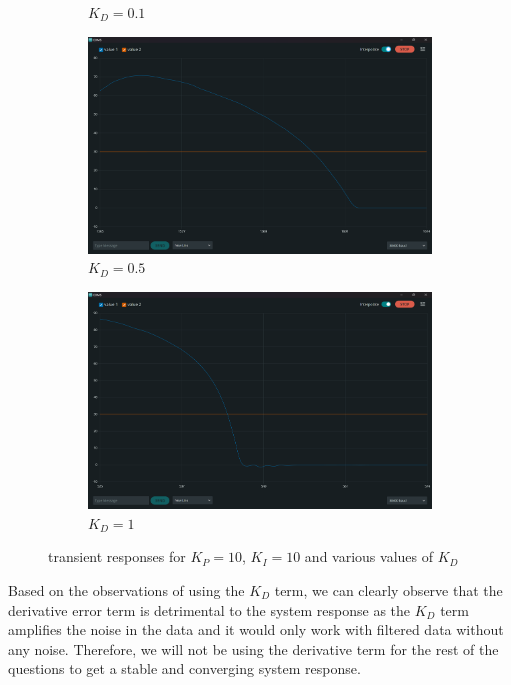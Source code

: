 \documentclass[12pt]{article}
\begin{document}
\begin{figure}[h]
\begin{subfigure}{.49\textwidth}
		\caption{$K_D=0.1$}
    \end{subfigure}
	\begin{subfigure}{.49\textwidth}
        \centering
        \includegraphics[width=0.95\linewidth]{images/q1/10_10_0.5.png}
		\caption{$K_D=0.5$}
    \end{subfigure}
    \begin{subfigure}{.49\textwidth}
        \centering
        \includegraphics[width=0.95\linewidth]{images/q1/10_10_1.png} 
		\caption{$K_D=1$}
    \end{subfigure}
    \caption{transient responses for $K_P=10$, $K_I=10$ and various values of $K_D$}
\end{figure}

Based on the observations of using the $K_D$ term, we can clearly observe that the derivative error term is detrimental to the system response as the $K_D$ term amplifies the noise in the data and it would only work with filtered data without any noise. Therefore, we will not be using the derivative term for the rest of the questions to get a stable and converging system response.
\end{document}
